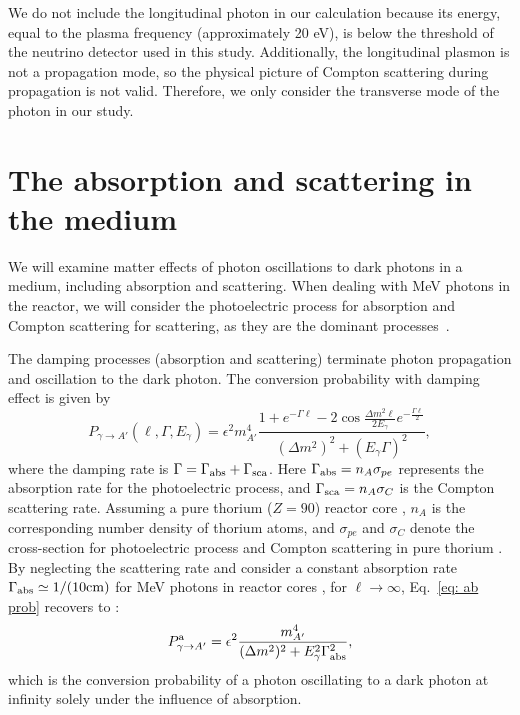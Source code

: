 \documentclass[prd,showpacs,preprintnumbers,amsmath,amssymb,twocolumn,superscriptaddress,notitlepage]{revtex4-2}
\begin{document}
We do not include the longitudinal photon in our calculation because its energy, equal to the plasma frequency (approximately 20 eV), is below the threshold of the neutrino detector used in this study. Additionally, the longitudinal plasmon is not a propagation mode, so the physical picture of Compton scattering during propagation is not valid. Therefore, we only consider the transverse mode of the photon in our study.
\\


\section{The absorption and scattering in the medium}

We will examine matter effects of photon oscillations to dark photons in a medium, including absorption and scattering.  
When dealing with MeV photons in the reactor, we will consider the photoelectric process for absorption and Compton scattering for scattering, as they are the dominant processes~\cite{ParticleDataGroup:2022pth}.




The damping processes (absorption and scattering) terminate photon propagation and oscillation to the dark photon. 
The conversion probability with damping effect is given by \cite{Redondo:2015iea}
\begin{equation}
P_{\gamma \to A'}(\ell, \Gamma
, E_\gamma) 
= \epsilon^2 m_{A'}^4 \frac{1+e^{-\Gamma \ell}-2 \cos \frac{\Delta m^2 \ell}{2 E_\gamma} e^{-\frac{\Gamma \ell}{2}}}{\left(\Delta m^2\right)^2+(E_\gamma \Gamma)^2},
\label{eq: ab prob}
\end{equation}
where the damping rate is $\Gamma = \Gamma_{\rm abs} + \Gamma_{\rm sca}$.
Here
$\Gamma_{\rm abs} = n_A \sigma_{{pe}}$ represents the absorption rate for the photoelectric process,
and $\Gamma_{\rm sca} = n_A \sigma_C$ is the Compton scattering rate.
Assuming a pure thorium ($Z=90$) reactor core \cite{Dent:2019ueq},
$n_A$ is the corresponding number density of thorium atoms, and $\sigma_{pe}$ and $\sigma_C$ denote the cross-section for photoelectric process and Compton scattering in pure thorium \cite{Berger:xcom}. 
By neglecting the scattering rate and consider a constant absorption rate $\Gamma_{\rm abs} \simeq 1/(10 \rm{cm})$ for MeV photons in reactor cores \cite{Danilov:2018bks}, for $\ell \to \infty$, Eq.~\eqref{eq: ab prob} recovers to \cite{Redondo:2008aa, An:2013yfc, Redondo:2013lna, Redondo:2015iea}:
\begin{equation}
P_{\gamma \to A'}^{\rm{a }} = \epsilon^2 \frac{ m_{A'}^4}{(\Delta m^2)^2 + E_\gamma^2 \Gamma_{\rm abs}^2},
\label{eq: prob limit}
\end{equation}
which is the conversion probability of a photon oscillating to a dark photon at infinity solely under the influence of absorption.
\end{document}

